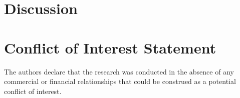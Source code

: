 \documentclass[utf8]{article}
\begin{document}

\section*{Discussion} 






\section*{Conflict of Interest Statement}
The authors declare that the research was conducted in the absence of any commercial or financial relationships that could be construed as a potential conflict of interest.
\end{document}
